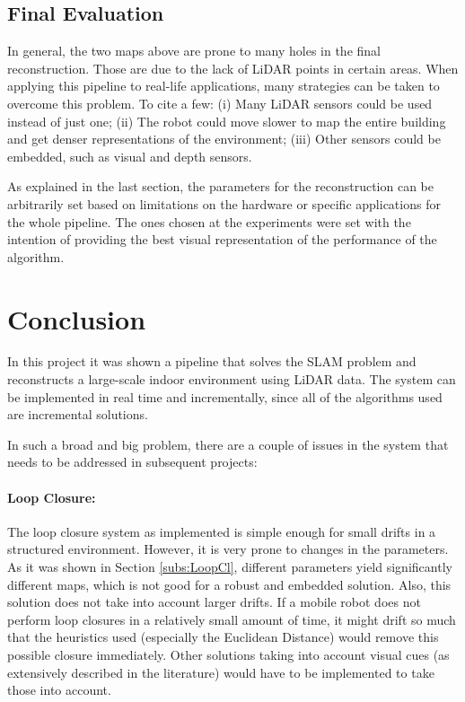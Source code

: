 \documentclass[12pt]{article}
\begin{document}
	\subsection{Final Evaluation}
	
In general, the two maps above are prone to many holes in the final reconstruction. Those are due to the lack of LiDAR points in certain areas. When applying this pipeline to real-life applications, many strategies can be taken to overcome this problem. To cite a few: (i) Many LiDAR sensors could be used instead of just one; (ii) The robot could move slower to map the entire building and get denser representations of the environment; (iii) Other sensors could be embedded, such as visual and depth sensors.
	
As explained in the last section, the parameters for the reconstruction can be arbitrarily set based on limitations on the hardware or specific applications for the whole pipeline. The ones chosen at the experiments were set with the intention of providing the best visual representation of the performance of the algorithm.
		
	\newpage
	\section{Conclusion}
	
In this project it was shown a pipeline that solves the SLAM problem and reconstructs a large-scale indoor environment using LiDAR data. The system can be implemented in real time and incrementally, since all of the algorithms used are incremental solutions.
		
In such a broad and big problem, there are a couple of issues in the system that needs to be addressed in subsequent projects:
	
\paragraph{Loop Closure: } The loop closure system as implemented is simple enough for small drifts in a structured environment. However, it is very prone to changes in the parameters. As it was shown in Section \ref{subs:LoopCl}, different parameters yield significantly different maps, which is not good for a robust and embedded solution. Also, this solution does not take into account larger drifts. If a mobile robot does not perform loop closures in a relatively small amount of time, it might drift so much that the heuristics used (especially the Euclidean Distance) would remove this possible closure immediately. Other solutions taking into account visual cues (as extensively described in the literature) would have to be implemented to take those into account.
	
\end{document}
